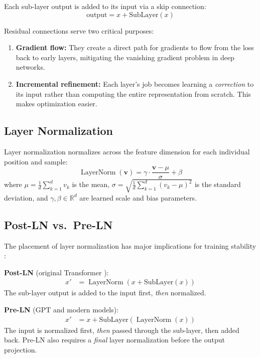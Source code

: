 \documentclass[11pt,a4paper]{article}
\newcommand{\R}{\mathbb{R}}
\newcommand{\LayerNorm}{\operatorname{LayerNorm}}
\begin{document}
Each sub-layer output is added to its input via a skip connection:
\begin{equation}
  \text{output} = x + \text{SubLayer}(x)
\end{equation}

Residual connections serve two critical purposes:
\begin{enumerate}[nosep]
  \item \textbf{Gradient flow:} They create a direct path for gradients to flow from
    the loss back to early layers, mitigating the vanishing gradient problem in deep
    networks.
  \item \textbf{Incremental refinement:} Each layer's job becomes learning a
    \emph{correction} to its input rather than computing the entire representation from
    scratch. This makes optimization easier.
\end{enumerate}

\subsection{Layer Normalization}

Layer normalization \cite{xiong2020} normalizes across the feature dimension for each
individual position and sample:
\begin{equation}
  \LayerNorm(\bm{v}) = \gamma \cdot \frac{\bm{v} - \mu}{\sigma} + \beta
\end{equation}
where $\mu = \frac{1}{d}\sum_{k=1}^{d} v_k$ is the mean,
$\sigma = \sqrt{\frac{1}{d}\sum_{k=1}^{d}(v_k - \mu)^2}$ is the standard deviation,
and $\gamma, \beta \in \R^d$ are learned scale and bias parameters.

\subsection{Post-LN vs.\ Pre-LN}
\label{sec:post-pre-ln}

The placement of layer normalization has major implications for training stability
\cite{xiong2020}:

\textbf{Post-LN} (original Transformer \cite{vaswani2017}):
\begin{align}
  x' &= \LayerNorm(x + \text{SubLayer}(x))
\end{align}
The sub-layer output is added to the input first, \emph{then} normalized.

\textbf{Pre-LN} (GPT and modern models):
\begin{align}
  x' &= x + \text{SubLayer}(\LayerNorm(x))
\end{align}
The input is normalized first, \emph{then} passed through the sub-layer, then added back.
Pre-LN also requires a \emph{final} layer normalization before the output projection.
\end{document}
